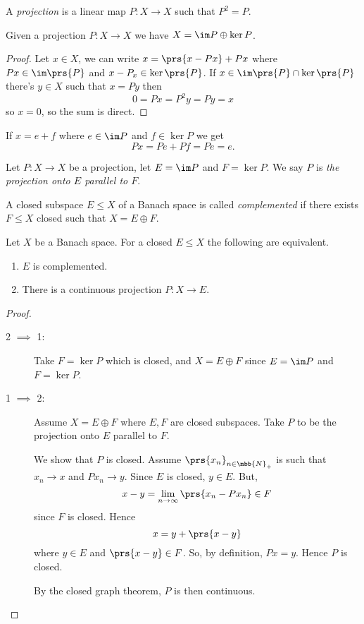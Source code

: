 \documentclass[10pt, twoside]{book}
\begin{document}
\begin{definition}[Projection]
A \emph{projection} is a linear map $P \colon X \to X$ such that $P^2 = P$.
\end{definition}

\begin{proposition}
Given a projection $P \colon X \to X$ we have $X = \im P \oplus \ker P$.
\end{proposition}

\begin{proof}
Let $x \in X$, we can write $x = \prs{x - Px} + Px$ where $Px \in \im\prs{P}$ and $x - P_x \in \ker \prs{P}$. If $x \in \im\prs{P} \cap \ker\prs{P}$ there's $y \in X$ such that $x = Py$ then
\[0 = Px = P^2 y = Py = x\]
so $x = 0$, so the sum is direct.
\end{proof}

\begin{remark}
If $x = e + f$ where $e \in \im P$ and $f \in \ker P$ we get
\[Px = Pe + Pf = Pe = e \text{.}\]
\end{remark}

\begin{definition}
Let $P \colon X \to X$ be a projection, let $E = \im P$ and $F = \ker P$. We say $P$ is \emph{the projection onto $E$ parallel to $F$}.
\end{definition}

\begin{definition}
A closed subspace $E \leq X$ of a Banach space is called \emph{complemented} if there exists $F \leq X$ closed such that $X = E \oplus F$.
\end{definition}

\begin{theorem}
Let $X$ be a Banach space.
For a closed $E \leq X$ the following are equivalent.
\begin{enumerate}
\item $E$ is complemented.
\item There is a continuous projection $P \colon X \to E$.
\end{enumerate}
\end{theorem}

\begin{proof}
\begin{description}
\item[2 $\implies$ 1:]
Take $F = \ker P$ which is closed, and $X = E \oplus F$ since $E = \im P$ and $F = \ker P$.
\item[1 $\implies$ 2:]
Assume $X = E \oplus F$ where $E,F$ are closed subspaces. Take $P$ to be the projection onto $E$ parallel to $F$.

We show that $P$ is closed. Assume $\prs{x_n}_{n \in \mbb{N}_+}$ is such that $x_n \to x$ and $P x_n \to y$. Since $E$ is closed, $y \in E$. But,
\[x-y = \lim_{n\to\infty} \prs{x_n - P x_n} \in F\]
since $F$ is closed.
Hence
\[x = y + \prs{x-y}\]
where $y \in E$ and $\prs{x-y} \in F$.
So, by definition, $Px = y$.
Hence $P$ is closed.

By the closed graph theorem, $P$ is then continuous.
\end{description}
\end{proof}
\end{document}
